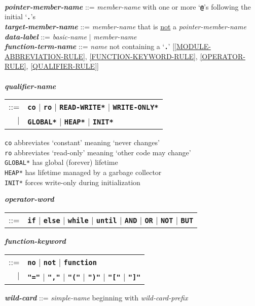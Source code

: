 \documentclass[12pt]{article}
\newcommand{\TT}[1]{{\tt \bfseries #1}}
\newcommand{\ttkey}[1]{{\tt \bfseries #1}}
\newcommand{\emkey}[1]{{\em \bfseries #1}}
\newcommand{\ttakey}[1]{{\tt \bfseries *#1*}}
\newenvironment{indpar}[1][0.3in]%
	{\begin{list}{}%
		     {\setlength{\itemsep}{0in}%
		      \setlength{\topsep}{0in}%
		      \setlength{\parsep}{1ex}%
		      \setlength{\labelwidth}{#1}%
		      \setlength{\leftmargin}{#1}%
		      \addtolength{\leftmargin}{\labelsep}}%
	 \item}%
	{\end{list}}
\begin{document}
\begin{indpar}
\begin{tabular}[t]{@{}l@{}}
			\end{tabular} \\
\emkey{pointer-member-name}\label{POINTER-MEMBER-NAME} ::=
    {\em member-name} with one or more `\TT{@}'s
    following the initial `\TT{.}'s \\
\emkey{target-member-name}\label{TARGET-MEMBER-NAME} ::=
    {\em member-name} that is \underline{not} a {\em pointer-member-name}
\\[1ex]
\emkey{data-label}\label{DATA-LABEL} ::=
    {\em basic-name} $|$ {\em member-name}
\\[1ex]
\emkey{function-term-name} ::= {\em name} not containing a `\TT{.}'
    \label{FUNCTION-TERM-NAME}
	[\ref{MODULE-ABBREVIATION-RULE},
	 \ref{FUNCTION-KEYWORD-RULE},
	 \ref{OPERATOR-RULE},
	 \ref{QUALIFIER-RULE}] \\
\\[1ex]
\emkey{qualifier-name}\label{QUALIFIER-NAME}
    \begin{tabular}[t]{rl}
    ::= & \ttkey{co} $|$ \ttkey{ro} $|$ \ttakey{READ-WRITE}
                     $|$ \ttakey{WRITE-ONLY} \\
    $|$ & \ttakey{GLOBAL} $|$ \ttakey{HEAP} $|$ \ttakey{INIT} \\
    \end{tabular}
\begin{indpar}
{\tt co} abbreviates `constant' meaning `never changes' \\
{\tt ro} abbreviates `read-only' meaning `other code may change' \\
{\tt *GLOBAL*} has global (forever) lifetime \\
{\tt *HEAP*} has lifetime managed by a garbage collector \\
{\tt *INIT*} forces write-only during initialization
\end{indpar}
\emkey{operator-word}
    \begin{tabular}[t]{rl}
    ::= & \TT{if} $|$ \TT{else} $|$ \TT{while} $|$ \TT{until}
                  $|$ \TT{AND} $|$ \TT{OR}
		  $|$ \TT{NOT} $|$ \TT{BUT}
    \end{tabular}

\emkey{function-keyword}
    \begin{tabular}[t]{rl}
    ::= & \TT{no} $|$ \TT{not} $|$ \TT{function} \\
    $|$ & \TT{"="} $|$ \TT{","} $|$ \TT{"("} $|$ \TT{")"} $|$
          \TT{"["} $|$ \TT{"]"}
    \end{tabular}

\emkey{wild-card}\label{WILD-CARD}
    ::= {\em simple-name} beginning with {\em wild-card-prefix}


\end{indpar}
\end{document}

